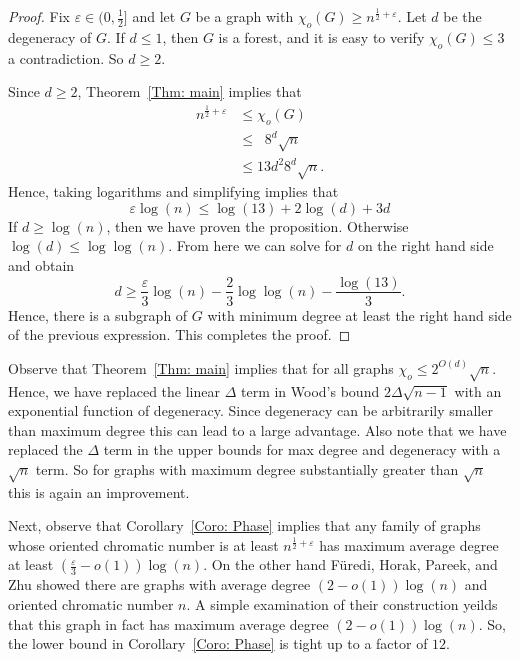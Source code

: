 \documentclass[11pt]{article}
\theoremstyle{definition}
\def\epsilon{\varepsilon}
\DeclareMathOperator{\coe}{6\Big(1+\frac{9d^2}{4}\Big)^{\frac{1}{2}}d}
\begin{document}
\begin{proof}
    Fix $\epsilon \in (0,\frac{1}{2}]$
    and let $G$ be a graph with $\chi_o(G)\geq n^{\frac{1}{2}+\epsilon}$.
    Let $d$ be the degeneracy of $G$.
    If $d\leq 1$, then $G$ is a forest, and it is easy to verify $\chi_o(G) \leq 3$
    a contradiction.
    So $d \geq 2$.

    Since $d \geq 2$, Theorem~\ref{Thm: main}
    implies that 
    \begin{align*}
        n^{\frac{1}{2}+\epsilon} & \leq \chi_o(G) \\
        & \leq \coe8^{d}\sqrt{n} \\
        & \leq 13d^2 8^d \sqrt{n}.
    \end{align*}
    Hence, taking logarithms and simplifying implies that
    \[
    \epsilon\log(n) \leq \log(13) + 2\log(d) + 3d
    \]
    If $d\geq \log(n)$, then we have proven the proposition.
    Otherwise $\log(d) \leq \log\log(n)$.
    From here we can solve for $d$ on the right hand side and obtain
    \[
    d\geq \frac{\epsilon}{3}\log(n) - \frac{2}{3} \log\log(n) - \frac{\log(13)}{3}.
    \]
    Hence, there is a subgraph of $G$ with minimum degree at least the right hand side of
    the previous expression.
    This completes the proof.
\end{proof}

Observe that Theorem~\ref{Thm: main} implies that 
for all graphs $\chi_o \leq 2^{O(d)}\sqrt{n}$.
Hence, we have replaced the linear $\Delta$ term in
Wood's \cite{wood2007oriented} bound $2\Delta\sqrt{n-1}$
with an exponential function of degeneracy.
Since degeneracy can be arbitrarily smaller than maximum degree
this can lead to a large advantage.
Also note that we have replaced the $\Delta$ term 
in the upper bounds for max degree and degeneracy \cite{CLOW2026,das2017chromatic}
with a $\sqrt{n}$ term.
So for graphs with maximum degree substantially greater than $\sqrt{n}$
this is again an improvement.

Next, observe that Corollary~\ref{Coro: Phase}
implies that any family of graphs
whose oriented chromatic number  is at least  $n^{\frac{1}{2}+\epsilon}$
has maximum average degree at least $(\frac{\epsilon}{3}-o(1))\log(n)$.
On the other hand F{\"u}redi,  Horak, Pareek, and Zhu \cite{furedi1998minimal}
showed there are graphs with average degree $(2-o(1))\log(n)$ and oriented chromatic number
$n$.
A simple examination of their construction yeilds that this graph in fact has 
maximum average degree $(2-o(1))\log(n)$.
So, the lower bound in Corollary~\ref{Coro: Phase} is tight up to a factor of $12$.
\end{document}
